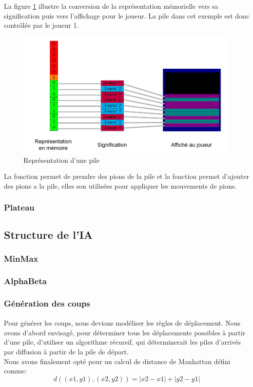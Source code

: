 \documentclass[article, backcover, french, nodocumentinfo]{upmethodology-document}
\begin{document}
					La figure \ref{fig:pile_représentation} illustre la conversion de la représentation mémorielle vers sa signification puis vers l'affichage pour le joueur. La pile dans cet exemple est donc contrôlée par le joueur 1.
					\begin{figure}[H]
						\centering
						\includegraphics[width=\textwidth]{figures/pile}
						\caption{Représentation d'une pile}
						\label{fig:pile_représentation}
					\end{figure}
					La fonction  permet de prendre des pions de la pile et la fonction  permet d'ajouter des pions a la pile, elles son utilisées pour appliquer les mouvements de pions.
			\subsubsection{Plateau}
		\subsection{Structure de l'IA}
			\subsubsection{MinMax}
			\subsubsection{AlphaBeta}
			\subsubsection{Génération des coups}
				\paragraph{}
					Pour générer les coups, nous devions modéliser les règles de déplacement. Nous avons d'abord envisagé, pour déterminer tous les déplacements possibles à partir d'une pile, d'utiliser un algorithme récursif, qui déterminerait les piles d'arrivés par diffusion à partir de la pile de départ.\\
					Nous avons finalement opté pour un calcul de distance de Manhattan défini comme:
					\[d((x1,y1),(x2,y2)) = |x2 - x1| + |y2 -y1|\]
\end{document}
